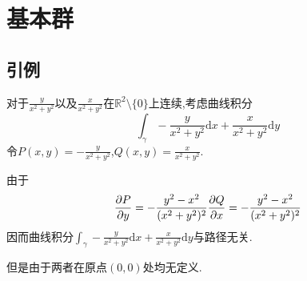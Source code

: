 \documentclass{article}
\begin{document}
\section{基本群}
\subsection{引例}
对于$\frac{y}{x^2+y^2}$以及$\frac{x}{x^2+y^2}$在$\mathbb{R}^2 \setminus\{0\}$上连续,考虑曲线积分
$$
\int_{\gamma} -\frac{y}{x^2+y^2}\text{d}x + \frac{x}{x^2+y^2}\text{d}y
$$
令$P(x,y) = -\frac{y}{x^2+y^2}$,$Q(x,y) = \frac{x}{x^2+y^2}$.


由于
$$
\frac{\partial P}{\partial y} = -\frac{y^2-x^2}{(x^2+y^2)^2}\\
\frac{\partial Q}{\partial x} = -\frac{y^2-x^2}{(x^2+y^2)^2}
$$
因而曲线积分$\int_\gamma -\frac{y}{x^2+y^2}\text{d}x + \frac{x}{x^2+y^2}\text{d}y$与路径无关.


但是由于两者在原点$(0,0)$处均无定义.
\end{document}
